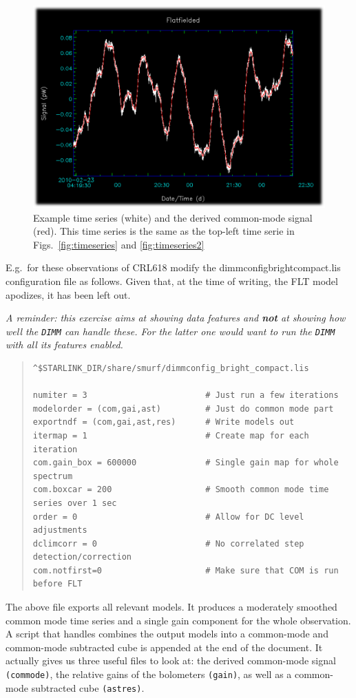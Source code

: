 \documentclass[twoside,11pt]{article}
\renewcommand{\_}{\texttt{\symbol{95}}}
\newenvironment{myquote}{\begin{quote}\begin{small}}{\end{small}\end{quote}}
\begin{document}
\begin{figure}
\begin{center}
\includegraphics[width=0.45\linewidth]{sc19_dimm_common_mode}
\caption{ Example time series (white) and the derived
common-mode signal (red).  This time series is the same as the
top-left time serie in Figs.~\ref{fig:timeseries} and \ref{fig:timeseries2}}
\label{fig:dimmcommonmode}
\end{center}
\end{figure}

E.g.\ for these observations of CRL618 modify the
dimmconfig\_bright\_compact.lis configuration file as follows. Given
that, at the time of writing, the FLT model apodizes, it has been left
out.

{\sl A reminder: this exercise aims at showing data features and {\bf
not} at showing how well the \texttt{DIMM} can handle these. For the
latter one would want to run the \texttt{DIMM} with all its features
enabled.}

\begin{myquote}
\begin{verbatim}
^$STARLINK_DIR/share/smurf/dimmconfig_bright_compact.lis

numiter = 3                        # Just run a few iterations
modelorder = (com,gai,ast)         # Just do common mode part
exportndf = (com,gai,ast,res)      # Write models out
itermap = 1                        # Create map for each iteration
com.gain_box = 600000              # Single gain map for whole spectrum
com.boxcar = 200                   # Smooth common mode time series over 1 sec
order = 0                          # Allow for DC level adjustments
dclimcorr = 0                      # No correlated step detection/correction
com.notfirst=0                     # Make sure that COM is run before FLT
\end{verbatim}
\end{myquote}

The above file exports all relevant models. It produces a moderately
smoothed common mode time series and a single gain component for the
whole observation. A script that handles combines the output models
into a common-mode and common-mode subtracted cube is appended at the
end of the document. It actually gives us three useful files to look
at: the derived common-mode signal \texttt{(\_commode)}, the relative
gains of the bolometers \texttt{(\_gain)}, as well as a common-mode
subtracted cube \texttt{(\_astres)}.
\end{document}
